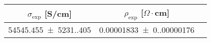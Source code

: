 \begin{tabular}{ccc}
\toprule
$\sigma_{\exp}$ [S/cm] & $\rho_{\exp}$ [$\Omega  \cdot$cm] \\
\midrule
\num{54545.455(5231.405)} & \num{0.00001833(0.00000176)} \\
\bottomrule
\end{tabular}
